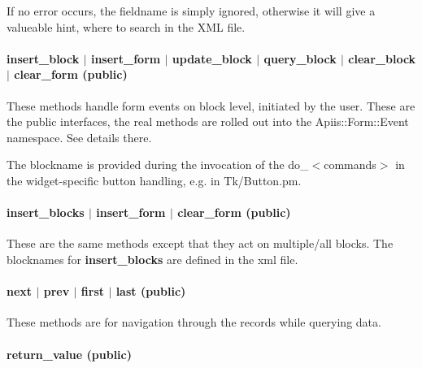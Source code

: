 If no error occurs, the fieldname is simply ignored, otherwise it will
give a valueable hint, where to search in the XML file.

\paragraph*{insert\_block $|$ insert\_form $|$ update\_block $|$ query\_block $|$ clear\_block $|$ clear\_form (public)\label{Apiis::Form::Init_--_base_package_for_Form_objects_of_all_types_insert_block_insert_form_update_block_query_block_clear_block_clear_form_public_}}


These methods handle form events on block level, initiated by the user. These
are the public interfaces, the real methods are rolled out into the
Apiis::Form::Event namespace. See details there.



The blockname is provided during the invocation of the do\_$<$commands$>$ in the
widget-specific button handling, e.g. in Tk/Button.pm.

\paragraph*{insert\_blocks $|$ insert\_form $|$ clear\_form (public)\label{Apiis::Form::Init_--_base_package_for_Form_objects_of_all_types_insert_blocks_insert_form_clear_form_public_}}


These are the same methods except that they act on multiple/all blocks.
The blocknames for \textbf{insert\_blocks} are defined in the xml file.

\paragraph*{next $|$ prev $|$ first $|$ last (public)\label{Apiis::Form::Init_--_base_package_for_Form_objects_of_all_types_next_prev_first_last_public_}}


These methods are for navigation through the records while querying data.

\paragraph*{return\_value (public)\label{Apiis::Form::Init_--_base_package_for_Form_objects_of_all_types_return_value_public_}}


